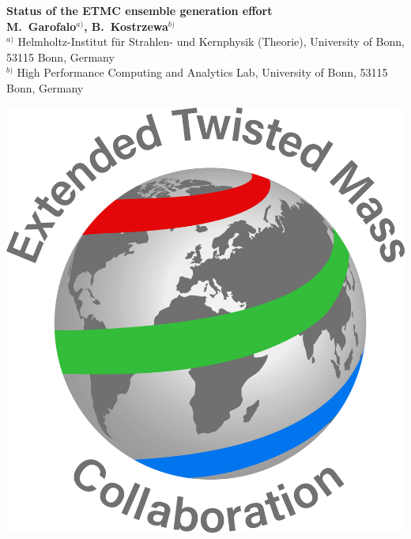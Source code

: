 \documentclass[a0,portrait]{a0poster}
\begin{document}


\begin{minipage}[b]{0.74\linewidth}
    \VeryHuge \color{NavyBlue} \textbf{Status of the ETMC ensemble generation effort} \color{Black}\\ %
    \Large \textbf{M.~Garofalo$^{a)}$, B.~Kostrzewa$^{b)}$}\\[0.5cm] %
    \Large $^{a)}$ Helmholtz-Institut f{\"u}r Strahlen- und Kernphysik (Theorie), University of Bonn, 53115 Bonn, Germany\\
    \Large $^{b)}$ High Performance Computing and Analytics Lab, University of Bonn, 53115 Bonn, Germany\\
\end{minipage}
%
\begin{minipage}[b]{0.26\linewidth}
    \includegraphics[width=14cm]{figures/Logo_ETMC_RGB.pdf}
\end{minipage}
\end{document}
